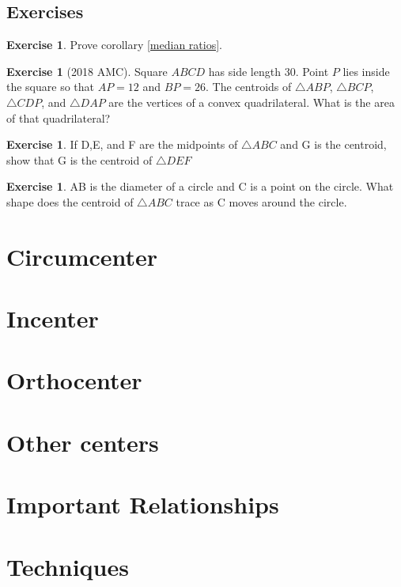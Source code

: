 \documentclass[letterpaper]{article}
\theoremstyle{plain}
\theoremstyle{definition}
\newtheorem{exercise}[thm]{Exercise}
\theoremstyle{remark}
\begin{document}
    \subsection*{Exercises}
    \begin{exercise}
        Prove corollary \ref{median ratios}.
    \end{exercise}
    \begin{exercise}[2018 AMC]
        Square $ABCD$ has side length $30$. Point $P$ lies inside the square so that $AP = 12$ and $BP = 26$. The centroids of $\triangle{ABP}$, $\triangle{BCP}$, $\triangle{CDP}$, and $\triangle{DAP}$ are the vertices of a convex quadrilateral. What is the area of that quadrilateral?
    \end{exercise}
    \begin{exercise} If D,E, and F are the midpoints of $\triangle ABC$ and G is the centroid, show that G is the centroid of $\triangle DEF$
    \end{exercise}
    \begin{exercise} AB is the diameter of a circle and C is a point on the circle. What shape does the centroid of $\triangle ABC$ trace as C moves around the circle.
    \end{exercise}

\section{Circumcenter}
\section{Incenter}
\section{Orthocenter}
\section{Other centers}
\section{Important Relationships}
\section{Techniques}
\end{document}
